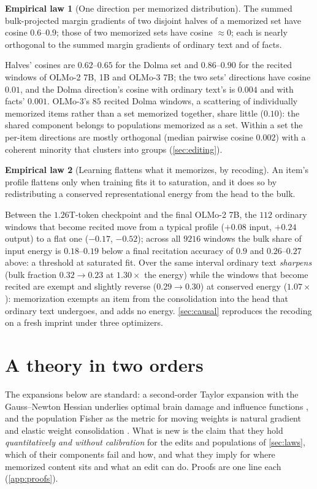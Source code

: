 \documentclass{article}
\theoremstyle{definition}\newtheorem{law}{Empirical law}
\begin{document}
\begin{law}[One direction per memorized distribution]\label{law:direction}
The summed bulk-projected margin gradients of two disjoint halves of a memorized set have cosine $0.6$--$0.9$; those of two memorized sets have cosine $\approx0$; each is nearly orthogonal to the summed margin gradients of ordinary text and of facts.
\end{law}
Halves' cosines are $0.62$--$0.65$ for the Dolma set and $0.86$--$0.90$ for the recited windows of OLMo-2 7B, 1B and OLMo-3 7B; the two sets' directions have cosine $0.01$, and the Dolma direction's cosine with ordinary text's is $0.004$ and with facts' $0.001$. OLMo-3's $85$ recited Dolma windows, a scattering of individually memorized items rather than a set memorized together, share little ($0.10$): the shared component belongs to populations memorized as a set. Within a set the per-item directions are mostly orthogonal (median pairwise cosine $0.002$) with a coherent minority that clusters into groups (\cref{sec:editing}).

\begin{law}[Learning flattens what it memorizes, by recoding]\label{law:dynamics}
An item's profile flattens only when training fits it to saturation, and it does so by redistributing a conserved representational energy from the head to the bulk.
\end{law}
Between the $1.26$T-token checkpoint and the final OLMo-2 7B, the $112$ ordinary windows that become recited move from a typical profile ($+0.08$ input, $+0.24$ output) to a flat one ($-0.17$, $-0.52$); across all $9216$ windows the bulk share of input energy is $0.18$--$0.19$ below a final recitation accuracy of $0.9$ and $0.26$--$0.27$ above: a threshold at saturated fit. Over the same interval ordinary text \emph{sharpens} (bulk fraction $0.32\to0.23$ at $1.30\times$ the energy) while the windows that become recited are exempt and slightly reverse ($0.29\to0.30$) at conserved energy ($1.07\times$): memorization exempts an item from the consolidation into the head that ordinary text undergoes, and adds no energy. \cref{sec:causal} reproduces the recoding on a fresh imprint under three optimizers.

\section{A theory in two orders}\label{sec:theory}

The expansions below are standard: a second-order Taylor expansion with the Gauss--Newton Hessian underlies optimal brain damage \citep{lecun1989optimal,hassibi1993optimal} and influence functions \citep{koh2017understanding,grosse2023studying}, and the population Fisher as the metric for moving weights is natural gradient \citep{amari1998natural,martens2020new} and elastic weight consolidation \citep{kirkpatrick2017overcoming}. What is new is the claim that they hold \emph{quantitatively and without calibration} for the edits and populations of \cref{sec:laws}, which of their components fail and how, and what they imply for where memorized content sits and what an edit can do. Proofs are one line each (\cref{app:proofs}).
\end{document}
